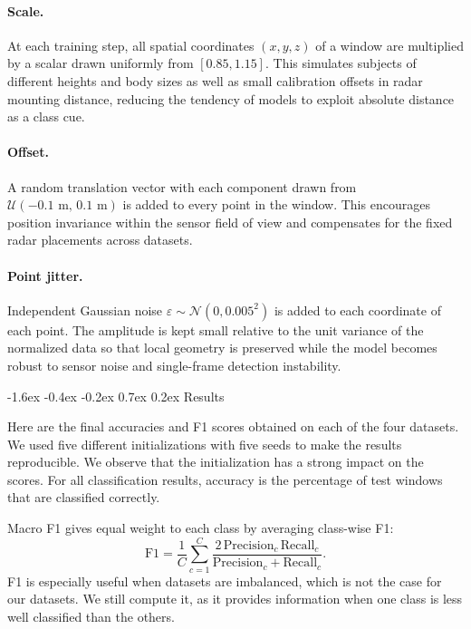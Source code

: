 \documentclass[10pt,twocolumn]{article}
\makeatletter
\renewcommand{\subsection}{%
  \@startsection{subsection}{2}{\z@}%
  {-1.6ex \@plus -0.4ex \@minus -0.2ex}%
  {0.7ex \@plus 0.2ex}%
  {\normalfont\normalsize\bfseries}}
\makeatother
\begin{document}
\paragraph{Scale.}
At each training step, all spatial coordinates $(x, y, z)$ of a window are multiplied by a
scalar drawn uniformly from $[0.85, 1.15]$. This simulates subjects of different heights and
body sizes as well as small calibration offsets in radar mounting distance, reducing the
tendency of models to exploit absolute distance as a class cue.

\paragraph{Offset.}
A random translation vector with each component drawn from
$\mathcal{U}(-0.1\text{ m},\,0.1\text{ m})$ is added to every point in the window.
This encourages position invariance within the sensor field of view and compensates
for the fixed radar placements across datasets.

\paragraph{Point jitter.}
Independent Gaussian noise $\varepsilon \sim \mathcal{N}(0, 0.005^2)$ is added to each
coordinate of each point. The amplitude is kept small relative to the unit variance of
the normalized data so that local geometry is preserved while the model becomes robust to
sensor noise and single-frame detection instability.

\subsection{Results}
\label{sec:pointnet-results}

Here are the final accuracies and F1 scores obtained on each of the four datasets. We used five different
initializations with five seeds to make the results reproducible. We observe that the initialization
has a strong impact on the scores.
For all classification results, accuracy is the percentage of test windows that
are classified correctly.

Macro F1 gives equal weight to each class by averaging class-wise F1:
\[
\mathrm{F1} = \frac{1}{C}\sum_{c=1}^{C}
\frac{2\,\mathrm{Precision}_c\,\mathrm{Recall}_c}
{\mathrm{Precision}_c+\mathrm{Recall}_c}.
\]
F1 is especially useful when datasets are imbalanced, which is not the case for our datasets.
We still compute it, as it provides information when one class is less well classified
than the others.
\end{document}
